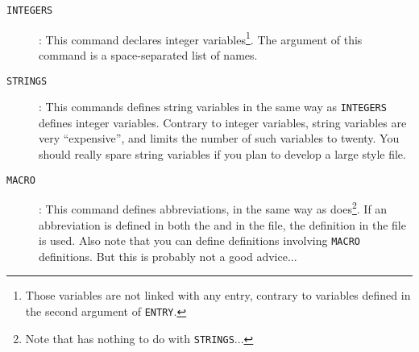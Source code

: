 \begin{description}
\item[\texttt{INTEGERS}]: This command
  declares integer variables\footnote{Those variables are not linked with any
  entry, contrary to variables defined in the second argument of
  \texttt{ENTRY}.}. The argument of this command is a space-separated
  list of names. 

\item[\texttt{STRINGS}]: This commands
  defines string variables in the same way as \texttt{INTEGERS} defines
  integer variables. Contrary to integer variables, string variables are very
  ``expensive'', and \bt limits the number of such variables to twenty. You
  should really spare string variables if you plan to develop a large style
  file. 

\item[\texttt{MACRO}]: This command defines
  abbreviations, in the same way as  does\footnote{Note that
   has nothing to do with
  \texttt{STRINGS}...}. 
  If an abbreviation is defined in both the  and in the
   file, the definition in the  file is used. Also note that
  you can define  definitions involving \texttt{MACRO}
  definitions. But this is probably not a good advice...


\end{description}
